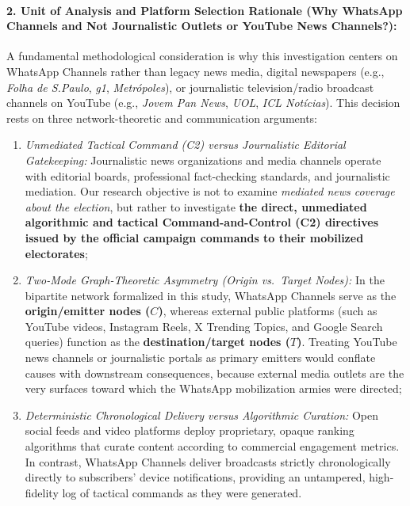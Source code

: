 \documentclass[preprint,12pt]{elsarticle}
\begin{document}
\paragraph{2. Unit of Analysis and Platform Selection Rationale (Why WhatsApp Channels and Not Journalistic Outlets or YouTube News Channels?):}
A fundamental methodological consideration is why this investigation centers on WhatsApp Channels rather than legacy news media, digital newspapers (e.g., \textit{Folha de S.Paulo}, \textit{g1}, \textit{Metrópoles}), or journalistic television/radio broadcast channels on YouTube (e.g., \textit{Jovem Pan News}, \textit{UOL}, \textit{ICL Notícias}). This decision rests on three network-theoretic and communication arguments:
\begin{enumerate}
    \item \textit{Unmediated Tactical Command (C2) versus Journalistic Editorial Gatekeeping:} Journalistic news organizations and media channels operate with editorial boards, professional fact-checking standards, and journalistic mediation. Our research objective is not to examine \textit{mediated news coverage about the election}, but rather to investigate \textbf{the direct, unmediated algorithmic and tactical Command-and-Control (C2) directives issued by the official campaign commands to their mobilized electorates};
    \item \textit{Two-Mode Graph-Theoretic Asymmetry (Origin vs.\ Target Nodes):} In the bipartite network formalized in this study, WhatsApp Channels serve as the \textbf{origin/emitter nodes ($C$)}, whereas external public platforms (such as YouTube videos, Instagram Reels, X Trending Topics, and Google Search queries) function as the \textbf{destination/target nodes ($T$)}. Treating YouTube news channels or journalistic portals as primary emitters would conflate causes with downstream consequences, because external media outlets are the very surfaces toward which the WhatsApp mobilization armies were directed;
    \item \textit{Deterministic Chronological Delivery versus Algorithmic Curation:} Open social feeds and video platforms deploy proprietary, opaque ranking algorithms that curate content according to commercial engagement metrics. In contrast, WhatsApp Channels deliver broadcasts strictly chronologically directly to subscribers' device notifications, providing an untampered, high-fidelity log of tactical commands as they were generated.
\end{enumerate}
\end{document}
